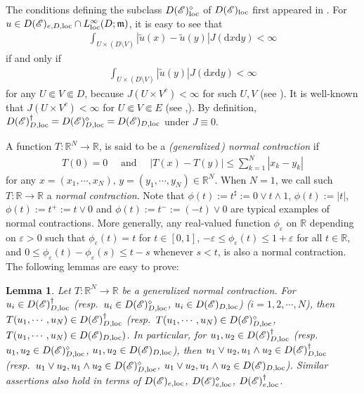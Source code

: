 \documentclass[12pt,a4paper]{article}
\newtheorem{lem}[thm]{Lemma}
\newcommand{\R}{\mathbb{R}}
\renewcommand{\d}{\mathrm{d}}
\newcommand{\m}{\mathfrak{m} }
\newcommand{\loc}{{\rm loc}}
\newcommand{\1}{{\bf 1}}
\newcommand{\eps}{{\varepsilon}}
\begin{document}
The conditions defining the 
subclass $D(\mathscr{E})_{\loc}^{\diamond}$ of $D(\mathscr{E})_{\loc}$ 
first appeared in \cite[(2.5)]{CK}. 
For $u\in D(\mathscr{E})_{e,D,\loc}\cap L^{\infty}_{\loc}(D;{\m})$, it is easy to see that 
\begin{align}
\int_{U\times (D\setminus V)}|\tilde{u}(x)-\tilde{u}(y)|J({\d} x{\d} y)<\infty\label{eq:finite}
\end{align}
if and only if 
\begin{align}
\int_{U\times (D\setminus V)}
|\tilde{u}(y)|J({\d} x{\d} y)<\infty\label{eq:finite*}
\end{align}
 for any 
$U\Subset V\Subset D$, because $J(U\times V^c)<\infty$ for such $U,V$ (see \cite[Remark~2.4(iii)]{CK}). It is well-known that $J(U\times V^c)<\infty$ for $U\Subset V\Subset E$ (see \cite[Corollary~5.1]{Kw:func},\cite[(2.3)]{Chen}). 
By definition, 
$D(\mathscr{E})_{D,\loc}^{\dag}= D(\mathscr{E})_{D,\loc}^{\diamond}= D(\mathscr{E})_{D,\loc}$ under $J\equiv0$. 

A  function $T:\R^N\to\R$, is said to be a \emph{{\rm(}generalized{\,\rm)} normal contraction} if 
\begin{align*}
T(0)=0\quad\text{ and }\quad |T(x)-T(y)|\leq \sum_{k=1}^N|x_k-y_k|
\end{align*}
for any $x=(x_1,\cdots,x_N)$, $y=(y_1,\cdots, y_N)\in\R^N$. 
When $N=1$, we call such $T:\R\to\R$ a \emph{normal contraction}. 
Note that $\phi(t):=t^{\sharp}:=0\lor t\land 1$, $\phi(t):=|t|$, $\phi(t):=t^+:=t\lor 0$ and $\phi(t):=t^-:=(-t)\lor0$ are typical examples of normal contractions. More generally, any real-valued function 
$\phi_{\eps}$ on $\R$ depending on $\eps>0$ such that $\phi_{\eps}(t)=t$ for $t\in[0,1]$, $-\eps\leq\phi_{\eps}(t)\leq 1+\eps$ for all $t\in\R$, and $0\leq\phi_{\eps}(t)-\phi_{\eps}(s)\leq t-s$ whenever $s<t$, is also a normal contraction. The following lemmas are easy to prove:

\begin{lem}\label{lem:contraction}
Let $T:\R^N\to\R$ be a generalized normal contraction. 
For $u_i\in D(\mathscr{E})_{D,\loc}^{\dag}$ {\rm(}resp.~$u_i\in D(\mathscr{E})_{D,\loc}^{\diamond}$, $u_i\in D(\mathscr{E})_{D,\loc}${\rm)} {\rm(}$i=1,2,\cdots, N${\rm)}, then $T(u_1,\cdots,u_N)\in 
 D(\mathscr{E})_{D,\loc}^{\dag}$ {\rm(}resp.~$T(u_1,\cdots,u_N)\in D(\mathscr{E})_{D,\loc}^{\diamond}$, $T(u_1,\cdots,u_N)\in D(\mathscr{E})_{D,\loc})$. In particular, for $u_1,u_2\in 
 D(\mathscr{E})_{D,\loc}^{\dag}$ {\rm(}resp.~$u_1,u_2\in D(\mathscr{E})_{D,\loc}^{\diamond}$, $u_1,u_2\in D(\mathscr{E})_{D,\loc}${\rm )}, then $u_1\lor u_2, u_1\land u_2\in D(\mathscr{E})_{D,\loc}^{\dag}$ {\rm(}resp.~$u_1\lor u_2, u_1\land u_2\in D(\mathscr{E})_{D,\loc}^{\diamond}$, $u_1\lor u_2, u_1\land u_2\in D(\mathscr{E})_{D,\loc}${\rm)}. 
Similar assertions also hold in terms of $D(\mathscr{E})_{e,\loc}$, $D(\mathscr{E})_{e,\loc}^{\diamond}$, $D(\mathscr{E})_{e,\loc}^{\dag}$. 
\end{lem}
\end{document}
